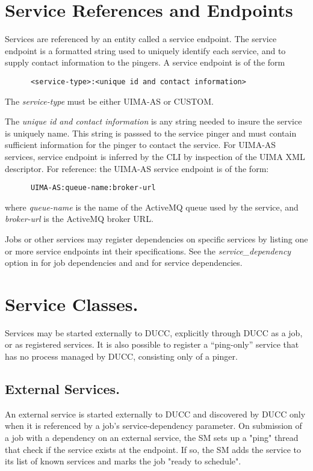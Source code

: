       \section{Service References and Endpoints} 
      \label{sec:service.endpoints}
      Services are referenced by an entity called a service
      endpoint. The service endpoint is a formatted string used to uniquely identify each
      service, and to supply contact information to the pingers.  A service endpoint
      is of the form 
\begin{verbatim}
      <service-type>:<unique id and contact information>
\end{verbatim}
      
      The {\em service-type} must be either UIMA-AS or CUSTOM.
      
      The {\em unique id and contact information} is any string needed to insure the service is
      uniquely name.  This string is passsed to the service pinger and must contain sufficient
      information for the pinger to contact the service.  For UIMA-AS services, service endpoint is
      inferred by the CLI by inspection of the UIMA XML descriptor.  For reference: the UIMA-AS
      service endpoint is of the form:
\begin{verbatim}
      UIMA-AS:queue-name:broker-url
\end{verbatim}
      where {\em queue-name} is the name of the ActiveMQ queue used by the service, and {\em broker-url}
      is the ActiveMQ broker URL.

      Jobs or other services may register dependencies on specific services by listing one or more
      service endpoints int their specifications. See the {\em service\_dependency} option in
       for job dependencies and and   for
      service dependencies.
      
      
      \section{Service Classes.} 
      \label{sec:service.classes}
      Services may be started externally to DUCC, explicitly through
      DUCC as a job, or as registered services.  It is also possible to register a ``ping-only''
      service that has no process managed by DUCC, consisting only of a pinger.

      \subsection{External Services.} 
      \label{sec:services.external}
      An external service is started externally to DUCC and discovered by DUCC only
      when it is referenced by a job's service-dependency parameter. On submission of a job with a
      dependency on an external service, the SM sets up a "ping" thread that check if the service
      exists at the endpoint. If so, the SM adds the service to its list of known services and marks
      the job "ready to schedule". 

